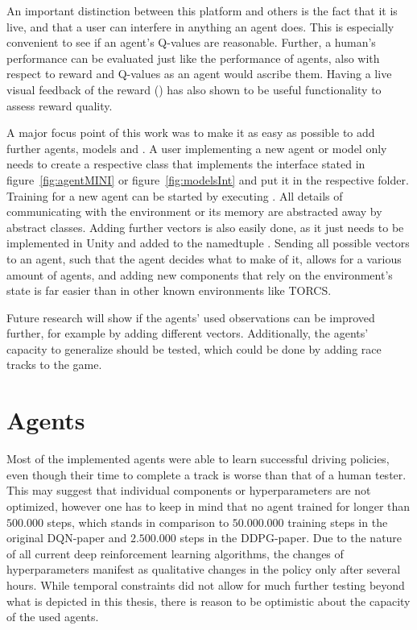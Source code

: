 An important distinction between this platform and others is the fact that it is live, and that a user can interfere in anything an agent does. This is especially convenient to see if an agent's Q-values are reasonable. Further, a human's performance can be evaluated just like the performance of agents, also with respect to reward and Q-values as an agent would ascribe them. Having a live visual feedback of the reward () has also shown to be useful functionality to assess reward quality.

A major focus point of this work was to make it as easy as possible to add further agents, models and . A user implementing a new agent or model only needs to create a respective class that implements the interface stated in figure~\ref{fig:agentMINI} or figure~\ref{fig:modelsInt} and put it in the respective folder. Training for a new agent can be started by executing . All details of communicating with the environment or its memory are abstracted away by abstract classes. Adding further vectors is also easily done, as it just needs to be implemented in Unity and added to the namedtuple . Sending all possible vectors to an agent, such that the agent decides what to make of it, allows for a various amount of agents, and adding new components that rely on the environment's state is far easier than in other known environments like TORCS.

Future research will show if the agents' used observations can be improved further, for example by adding different vectors. Additionally, the agents' capacity to generalize should be tested, which could be done by adding race tracks to the game.

\section{Agents}

Most of the implemented agents were able to learn successful driving policies, even though their time to complete a track is worse than that of a human tester. This may suggest that individual components or hyperparameters are not optimized, however one has to keep in mind that no agent trained for longer than $500.000$ steps, which stands in comparison to $50.000.000$ training steps in the original DQN-paper and $2.500.000$ steps in the DDPG-paper. Due to the nature of all current deep reinforcement learning algorithms, the changes of hyperparameters manifest as qualitative changes in the policy only after several hours. While temporal constraints did not allow for much further testing beyond what is depicted in this thesis, there is reason to be optimistic about the capacity of the used agents. 

